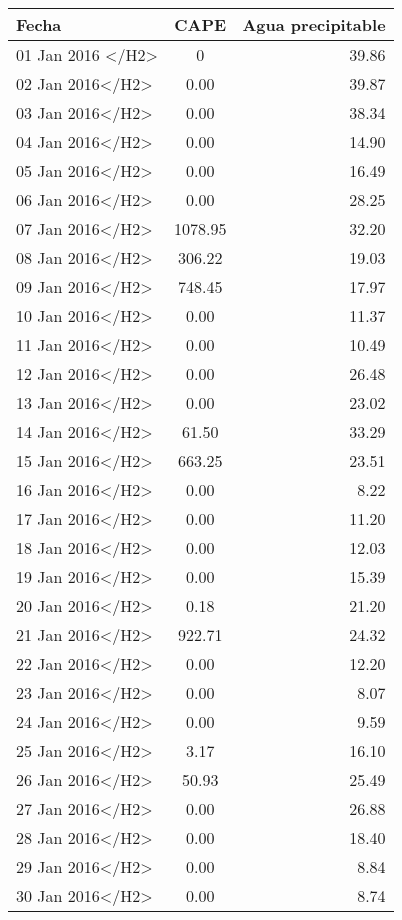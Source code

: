 \documentclass[a4paper,12pt]{article}
\begin{document}
\begin{center}
\begin{tabular}{|l|c|r|}
\hline
 Fecha  &   CAPE & Agua precipitable \\ \hline
 01 Jan 2016 </H2> &  0  &  39.86 \\ \hline
 02 Jan 2016</H2>&  0.00 & 39.87\\ \hline
 03 Jan 2016</H2> & 0.00 &  38.34\\ \hline
  04 Jan 2016</H2>&  0.00 &  14.90\\ \hline
  05 Jan 2016</H2>  & 0.00  & 16.49\\ \hline
 06 Jan 2016</H2> & 0.00 &    28.25\\ \hline
 07 Jan 2016</H2>&  1078.95 &   32.20\\ \hline
 08 Jan 2016</H2>  & 306.22 &   19.03\\ \hline
 09 Jan 2016</H2> &  748.45&   17.97\\ \hline
 10 Jan 2016</H2>&     0.00 &  11.37\\ \hline
 11 Jan 2016</H2>    & 0.00 & 10.49\\ \hline
 12 Jan 2016</H2>   &  0.00  & 26.48\\ \hline
 13 Jan 2016</H2>  &   0.00 & 23.02 \\ \hline
 14 Jan 2016</H2> &   61.50  & 33.29\\ \hline
  15 Jan 2016</H2>&   663.25   & 23.51\\ \hline
 16 Jan 2016</H2>   &  0.00    &8.22\\ \hline
 17 Jan 2016</H2>   &  0.00   & 11.20\\ \hline
 18 Jan 2016</H2>  &   0.00   & 12.03\\ \hline
 19 Jan 2016</H2> &    0.00  & 15.39\\ \hline
 20 Jan 2016</H2>&     0.18   & 21.20\\ \hline
 21 Jan 2016</H2>  & 922.71  &  24.32\\ \hline
 22 Jan 2016</H2> &    0.00 &12.20\\ \hline
 23 Jan 2016</H2>&     0.00   & 8.07\\ \hline
 24 Jan 2016</H2>&     0.00 &  9.59\\ \hline
 25 Jan 2016</H2>&     3.17  & 16.10\\ \hline
 26 Jan 2016</H2>  &  50.93   & 25.49\\ \hline
 27 Jan 2016</H2> &    0.00  & 26.88\\ \hline
 28 Jan 2016</H2> &    0.00  &  18.40\\ \hline
 29 Jan 2016</H2> &    0.00 &  8.84\\ \hline
 30 Jan 2016</H2> &    0.00  & 8.74\\ \hline

\end{tabular}
\end{center}
\end{document}
